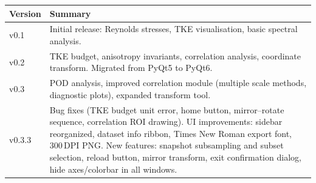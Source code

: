 \documentclass[11pt, a4paper]{report}
\begin{document}
\begin{table}[htbp]
\centering
\begin{tabular}{lp{12cm}}
\toprule
\textbf{Version} & \textbf{Summary} \\
\midrule
v0.1   & Initial release: Reynolds stresses, TKE visualisation, basic spectral analysis. \\
v0.2   & TKE budget, anisotropy invariants, correlation analysis, coordinate transform. Migrated from PyQt5 to PyQt6. \\
v0.3   & POD analysis, improved correlation module (multiple scale methods, diagnostic plots), expanded transform tool. \\
v0.3.3 & Bug fixes (TKE budget unit error, home button, mirror--rotate sequence, correlation ROI drawing). UI improvements: sidebar reorganized, dataset info ribbon, Times New Roman export font, 300\,DPI PNG. New features: snapshot subsampling and subset selection, reload button, mirror transform, exit confirmation dialog, hide axes/colorbar in all windows. \\
\bottomrule
\end{tabular}
\end{table}
\end{document}
